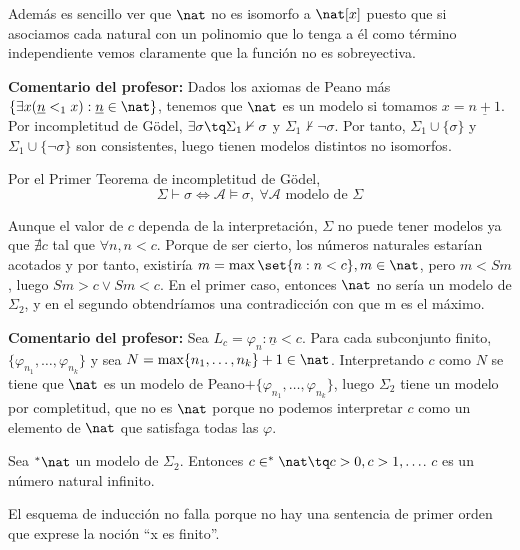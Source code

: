\begin{problem}
Además es sencillo ver que $\nat$ no es isomorfo a $\nat[x]$ puesto que si asociamos cada natural con un polinomio que lo tenga a él como término independiente vemos claramente que la función no es sobreyectiva.

\textbf{Comentario del profesor:}
Dados los axiomas de Peano más $\{\exists x (\underline{n}<_1 x): \underline{n}\in \nat \}$,
tenemos que $\nat$ es un modelo si tomamos $x = \underline{n+1}$. Por incompletitud de Gödel, 
$\exists \sigma \tq \Sigma_1 \nvdash \sigma$ y $\Sigma_1 \nvdash \neg \sigma$. Por tanto, $\Sigma_1\cup\{\sigma\}$ y $\Sigma_1\cup \{\neg\sigma\}$ son consistentes, luego tienen modelos distintos no isomorfos.

\spart

Por el Primer Teorema de incompletitud de Gödel,
\[ \Sigma \vdash \sigma \iff \mathcal{A} \models \sigma, \ \forall \mathcal{A} \text{ modelo de } \Sigma\]

Aunque el valor de $c$ dependa de la interpretación, $\Sigma$ no puede tener modelos ya que $\nexists c $ tal que $\forall n, n < c$. Porque de ser cierto, los números naturales estarían acotados y por tanto, existiría $m = \max\set{ n : n < c}, m \in \nat$, pero $m < Sm$, luego $Sm > c \lor Sm < c$. En el primer caso, entonces $\nat$ no sería un modelo de $\Sigma_2$, y en el segundo obtendríamos una contradicción con que m es el máximo.

\textbf{Comentario del profesor:}
Sea $L_c = \varphi_n: \underline{n} < c$. Para cada subconjunto finito, $\{\varphi_{n_1}, \hdots, \varphi_{n_k}\}$ y sea $N = \max\{n_1, \hdots, n_k\}+1\in \nat$. Interpretando $c$ como $N$ se tiene que $\nat$ es un modelo de Peano$+\{\varphi_{n_1}, \hdots, \varphi_{n_k}\}$, luego $\Sigma_2$ tiene un modelo por completitud, que no es $\nat$ porque no podemos interpretar $c$ como un elemento de $\nat$ que satisfaga todas las $\varphi$.

Sea $^*\nat$ un modelo de $\Sigma_2$. Entonces $c\in ^*\nat \tq c>0, c>1, \hdots$.
$c$ es un número natural infinito.

El esquema de inducción no falla porque no hay una sentencia de primer orden que exprese la noción ``x es finito''.
\end{problem}
